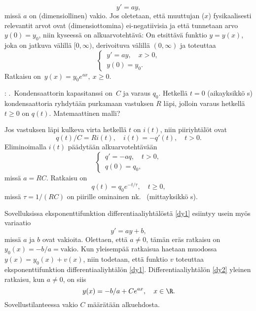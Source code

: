\begin{equation} \label{dy1}
y' = ay,
\end{equation}
missä $a$ on (dimensiollinen) vakio. Jos oletetaan, että muuttujan ($x$) fysikaalisesti 
relevantit arvot ovat (dimensiottomina) ei-negatiivisia ja että tunnetaan arvo $y(0) = y_0$, 
niin kyseessä on alkuarvotehtävä: On etsittävä funktio $y=y(x)$, joka on jatkuva välillä
$[0,\infty)$, derivoituva välillä $(0,\infty)$ ja toteuttaa
\[
\begin{cases} \,y' = ay, \quad x>0, \\ \,y(0) = y_0. \end{cases}
\]
Ratkaisu on $\,y(x)=y_0 e^{ax},\ x \ge 0$. 
%
\begin{Exa}: .\ Kondensaattorin kapasitanssi on $\,C$ ja varaus $q_0$.
Hetkellä $t=0$ (aikayksikkö s) kondensaattoria ryhdytään purkamaan vastuksen $R$ läpi, jolloin
varaus hetkellä $t \ge 0$ on $q(t)$. Matemaattinen malli?
\end{Exa}
\ratk Jos vastuksen läpi kulkeva virta hetkellä $t$ on $i(t)$, niin piiriyhtälöt ovat
\[ 
q(t)/C = Ri(t), \quad i(t) = -q'(t), \quad t>0. 
\]
Eliminoimalla $i(t)$ päädytään alkuarvotehtävään
\[ 
\begin{cases} \,q' = -aq, \quad t>0, \\ \,q(0) = q_0, \end{cases} 
\]
missä $a = RC$. Ratkaisu on
\[
q(t) = q_0 e^{-t/\tau}, \quad t \ge 0, 
\]
missä $\tau = 1/(RC)$ on piirille ominainen nk.\  (mittayksikkö s). \loppu  

Sovelluksissa eksponenttifunktion differentiaaliyhtälöstä \eqref{dy1} esiintyy usein myös
variaatio
\begin{equation} \label{dy2}
y' = ay + b,
\end{equation}
missä $a$ ja $b$ ovat vakioita. Olettaen, että $a \neq 0$, tämän eräs ratkaisu on 
$y_0(x) = -b/a = \text{vakio}$. Kun yleisempää ratkaisua haetaan muodossa
$y(x) = y_0(x) + v(x)$, niin todetaan, että funktio $v$ toteuttaa eksponenttifunktion
differentiaaliyhtälön \eqref{dy1}. Differentiaaliyhtälön \eqref{dy2} yleinen ratkaisu,
kun $a \neq 0$, on siis
\[ 
y(x) = -b/a + C e^{ax}, \quad x\in\R.
\]
Sovellustilanteessa vakio $C$ määrätään alkuehdosta.


